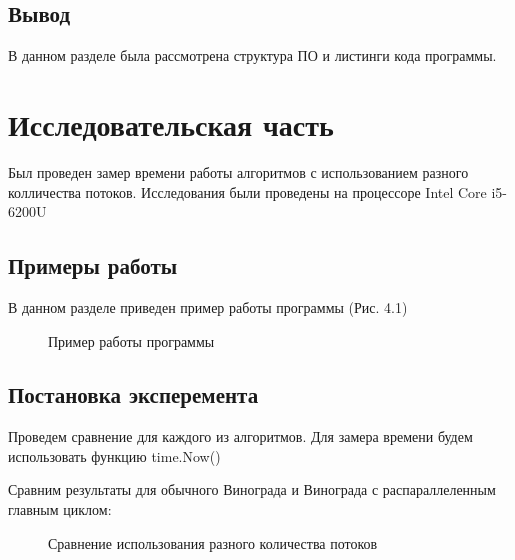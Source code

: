 \documentclass[12pt]{report}
\begin{document}
\section{Вывод}
В данном разделе была рассмотрена структура ПО и листинги кода программы.

\chapter{Исследовательская часть}
Был проведен замер времени работы алгоритмов с использованием разного колличества потоков.
Исследования были проведены на процессоре Intel Core i5-6200U
\section{Примеры работы}
В данном разделе приведен пример работы программы (Рис. 4.1)
\begin{figure}[h]
	\caption{Пример работы программы}
	\label{ris:example}
\end{figure}

\section{Постановка эксперемента}
Проведем сравнение для каждого из алгоритмов. Для замера времени будем использовать функцию time.Now()

Сравним результаты для обычного Винограда и Винограда с распараллеленным главным циклом:
\newpage

\begin{figure}
\caption{Сравнение использования разного количества потоков} \label{plot:even}
\end{figure}
\par
\end{document}
